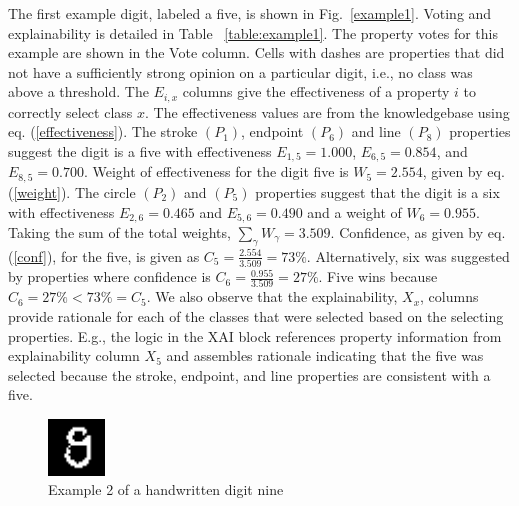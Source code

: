 \documentclass[conference]{IEEEtran}
\begin{document}
The first example digit, labeled a five, is shown in Fig.~\ref{example1}.  Voting and explainability is detailed in Table ~\ref{table:example1}.  The property votes for this example are shown in the Vote column.  Cells with dashes are properties that did not have a sufficiently strong opinion on a particular digit, i.e., no class was above a threshold.   The $E_{i,x}$ columns give the effectiveness of a property $i$ to correctly select class $x$.  The effectiveness values are from the knowledgebase using eq. (\ref{effectiveness}).   The stroke $(P_1)$, endpoint $(P_6)$ and line $(P_8)$ properties suggest the digit is a five with effectiveness $E_{1,5}= 1.000$, $E_{6,5}=0.854$, and $E_{8,5}=0.700$.  Weight of effectiveness for the digit five is $W_5=2.554$, given by eq. (\ref{weight}).  The circle $(P_2)$ and $(P_5)$ properties suggest that the digit is a six with effectiveness $E_{2,6}=0.465$ and $E_{5,6}=0.490$  and a weight of $W_6=0.955$.  Taking the sum of the total weights, $\sum\limits_\gamma W_\gamma=3.509$.  Confidence, as given by eq. (\ref{conf}), for the five, is given as $C_5=\frac{2.554}{3.509} = 73\%$.  Alternatively, six was suggested by properties where confidence is $C_6=\frac{0.955}{3.509}=27\%$.  Five wins because $C_6=27\% < 73\%=C_5$.  We also observe that the explainability, $X_x$, columns provide rationale for each of the classes that were selected based on the selecting properties.   E.g.,  the logic in the XAI block references property information from explainability column $X_5$ and assembles rationale indicating that the five was selected because the stroke, endpoint, and line properties are consistent with a five. 

 \begin{figure}[htbp]
\centerline{\includegraphics[width=15mm]{./digit-images/9-9.png}}
\caption{Example 2 of a handwritten digit nine}
\label{example2}
\end{figure}

\end{document}
